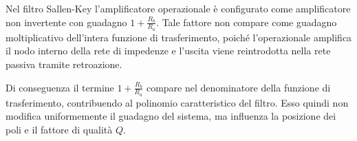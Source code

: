 Nel filtro Sallen-Key l'amplificatore operazionale è configurato come
amplificatore non invertente con guadagno $1+\frac{R_b}{R_a}$.
Tale fattore non compare come guadagno moltiplicativo dell'intera
funzione di trasferimento, poiché l'operazionale amplifica il nodo
interno della rete di impedenze e l'uscita viene reintrodotta nella
rete passiva tramite retroazione. 

Di conseguenza il termine
$1+\frac{R_b}{R_a}$ compare nel denominatore della funzione di
trasferimento, contribuendo al polinomio caratteristico del filtro.
Esso quindi non modifica uniformemente il guadagno del sistema, ma
influenza la posizione dei poli e il fattore di qualità $Q$.








